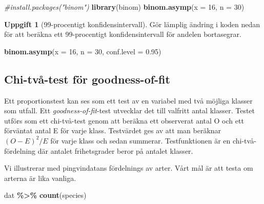 \documentclass[
]{book}
\newenvironment{Shaded}{\begin{snugshade}}{\end{snugshade}}
\newcommand{\AttributeTok}[1]{\textcolor[rgb]{0.13,0.29,0.53}{#1}}
\newcommand{\CommentTok}[1]{\textcolor[rgb]{0.56,0.35,0.01}{\textit{#1}}}
\newcommand{\DecValTok}[1]{\textcolor[rgb]{0.00,0.00,0.81}{#1}}
\newcommand{\FloatTok}[1]{\textcolor[rgb]{0.00,0.00,0.81}{#1}}
\newcommand{\FunctionTok}[1]{\textcolor[rgb]{0.13,0.29,0.53}{\textbf{#1}}}
\newcommand{\NormalTok}[1]{#1}
\newcommand{\SpecialCharTok}[1]{\textcolor[rgb]{0.81,0.36,0.00}{\textbf{#1}}}
\theoremstyle{definition}
\theoremstyle{definition}
\theoremstyle{definition}
\newtheorem{exercise}{Uppgift}[chapter]
\theoremstyle{definition}
\theoremstyle{remark}
\begin{document}
\begin{Shaded}
\begin{Highlighting}[]
\CommentTok{\#install.packages("binom")}
\FunctionTok{library}\NormalTok{(binom)}
\FunctionTok{binom.asymp}\NormalTok{(}\AttributeTok{x =} \DecValTok{16}\NormalTok{, }\AttributeTok{n =} \DecValTok{30}\NormalTok{)}
\end{Highlighting}
\end{Shaded}

\begin{exercise}[99-procentigt konfidensintervall]

Gör lämplig ändring i koden nedan för att beräkna ett 99-procentigt konfidensintervall för andelen bortasegrar.

\begin{Shaded}
\begin{Highlighting}[]
\FunctionTok{binom.asymp}\NormalTok{(}\AttributeTok{x =} \DecValTok{16}\NormalTok{, }\AttributeTok{n =} \DecValTok{30}\NormalTok{, }\AttributeTok{conf.level =} \FloatTok{0.95}\NormalTok{)}
\end{Highlighting}
\end{Shaded}

\end{exercise}

\subsection{Chi-två-test för goodness-of-fit}\label{chi-tvuxe5-test-fuxf6r-goodness-of-fit}

Ett proportionstest kan ses som ett test av en variabel med två möjliga klasser som utfall. Ett \emph{goodness-of-fit}-test utvecklar det till valfritt antal klasser. Testet utförs som ett chi-två-test genom att beräkna ett observerat antal O och ett förväntat antal E för varje klass. Testvärdet ges av att man beräknar \((O - E)^2 / E\) för varje klass och sedan summerar. Testfunktionen är en chi-två-fördelning där antalet frihetsgrader beror på antalet klasser.

Vi illustrerar med pingvindatans fördelnings av arter. Vårt mål är att testa om arterna är lika vanliga.

\begin{Shaded}
\begin{Highlighting}[]
\NormalTok{dat }\SpecialCharTok{\%\textgreater{}\%} \FunctionTok{count}\NormalTok{(species)}
\end{Highlighting}
\end{Shaded}
\end{document}
